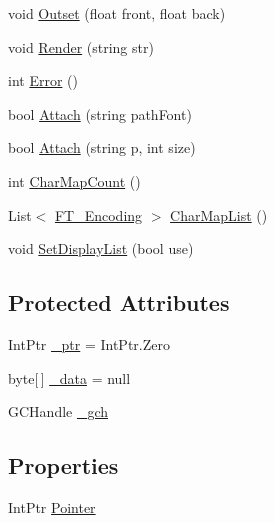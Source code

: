 \begin{DoxyCompactItemize}
void \hyperlink{class_tao_1_1_ft_gl_1_1_ft_gl_1_1_f_t_font_ab79c8814386e1f31a034f182c4c0e664}{Outset} (float front, float back)
\item 
void \hyperlink{class_tao_1_1_ft_gl_1_1_ft_gl_1_1_f_t_font_a4dca0cdd86fb267165638ab7989dc459}{Render} (string str)
\item 
int \hyperlink{class_tao_1_1_ft_gl_1_1_ft_gl_1_1_f_t_font_a3339555a40fea1089d1a1f8321e54b9f}{Error} ()
\item 
bool \hyperlink{class_tao_1_1_ft_gl_1_1_ft_gl_1_1_f_t_font_abcd3b8046da359bae8972052f0cb4410}{Attach} (string pathFont)
\item 
bool \hyperlink{class_tao_1_1_ft_gl_1_1_ft_gl_1_1_f_t_font_a6d45015b27c7303be7b0092e2bfb44df}{Attach} (string p, int size)
\item 
int \hyperlink{class_tao_1_1_ft_gl_1_1_ft_gl_1_1_f_t_font_a27eec2ce8486896c4baa53625a7b970a}{CharMapCount} ()
\item 
List$<$ \hyperlink{namespace_tao_1_1_free_type_a87a3c6633d19c2af09744e5a3d0a51ed}{FT\_\-Encoding} $>$ \hyperlink{class_tao_1_1_ft_gl_1_1_ft_gl_1_1_f_t_font_aa9ae86bafe92de04f5fa6d29d92a1100}{CharMapList} ()
\item 
void \hyperlink{class_tao_1_1_ft_gl_1_1_ft_gl_1_1_f_t_font_a8574dbf75151599b8148d787ba842f03}{SetDisplayList} (bool use)
\end{DoxyCompactItemize}
\subsection*{Protected Attributes}
\begin{DoxyCompactItemize}
\item 
IntPtr \hyperlink{class_tao_1_1_ft_gl_1_1_ft_gl_1_1_f_t_font_ae90b1c2f0ad98e4af764da8afedbdcdc}{\_\-ptr} = IntPtr.Zero
\item 
byte\mbox{[}$\,$\mbox{]} \hyperlink{class_tao_1_1_ft_gl_1_1_ft_gl_1_1_f_t_font_a264bf74df4541688591c0b7d4edf219c}{\_\-data} = null
\item 
GCHandle \hyperlink{class_tao_1_1_ft_gl_1_1_ft_gl_1_1_f_t_font_afc3521c1424646b6df272c7eb62a50d3}{\_\-gch}
\end{DoxyCompactItemize}
\subsection*{Properties}
\begin{DoxyCompactItemize}
\item 
IntPtr \hyperlink{class_tao_1_1_ft_gl_1_1_ft_gl_1_1_f_t_font_a0fe6dcd8dda1097cb79f22cb14f8caca}{Pointer}
\end{DoxyCompactItemize}


